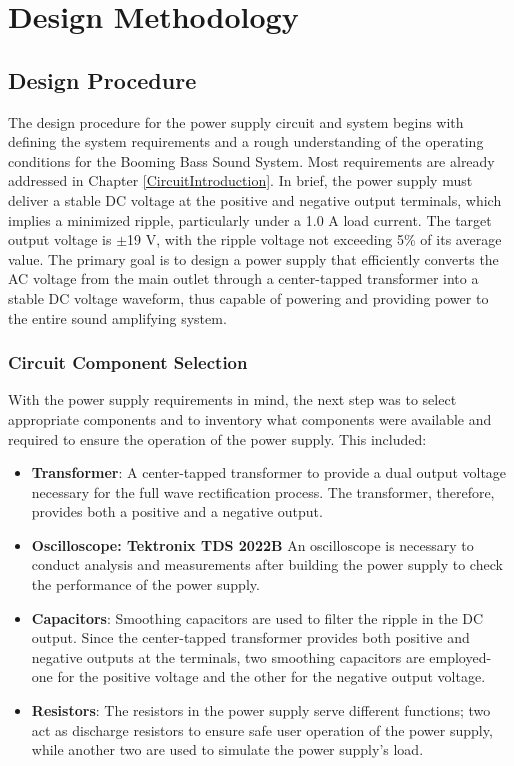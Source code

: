 \chapter{Design Methodology} 
\label{CircuitDesign}


\section{Design Procedure}
The design procedure for the power supply circuit and system begins with defining the system requirements and a rough understanding of the operating conditions for the Booming Bass Sound System. Most requirements are already addressed in Chapter \ref{CircuitIntroduction}. In brief, the power supply must deliver a stable DC voltage at the positive and negative output terminals, which implies a minimized ripple, particularly under a 1.0 A load current. The target output voltage is $\pm$19 V, with the ripple voltage not exceeding 5\% of its average value.
The primary goal is to design a power supply that efficiently converts the AC voltage from the main outlet through a center-tapped transformer into a stable DC voltage waveform, thus capable of powering and providing power to the entire sound amplifying system.

\subsection{Circuit Component Selection}
With the power supply requirements in mind, the next step was to select appropriate components and to inventory what components were available and required to ensure the operation of the power supply. This included:
\begin{itemize}
    \item \textbf{Transformer}: A center-tapped transformer to provide a dual output voltage necessary for the full wave rectification process. The transformer, therefore, provides both a positive and a negative output.
    \item \textbf{Oscilloscope: Tektronix TDS 2022B} An oscilloscope is necessary to conduct analysis and measurements after building the power supply to check the performance of the power supply.
    \item \textbf{Capacitors}: Smoothing capacitors are used to filter the ripple in the DC output. Since the center-tapped transformer provides both positive and negative outputs at the terminals, two smoothing capacitors are employed- one for the positive voltage and the other for the negative output voltage. 
    \item \textbf{Resistors}: The resistors in the power supply serve different functions; two act as discharge resistors to ensure safe user operation of the power supply, while another two are used to simulate the power supply's load. 
\end{itemize}

